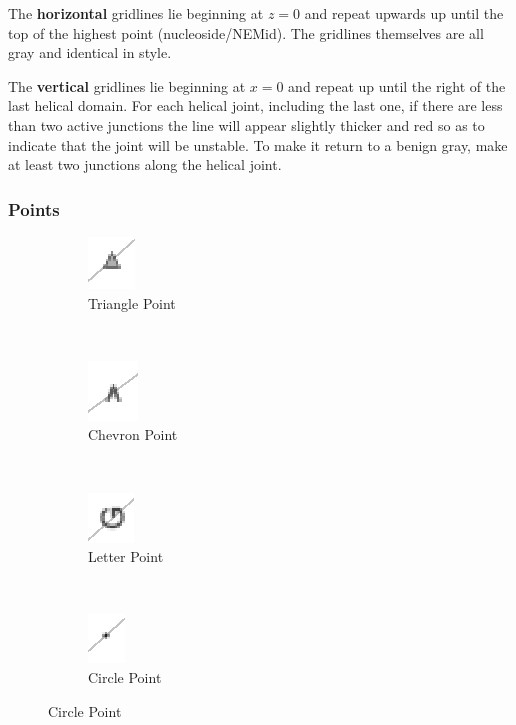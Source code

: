 \documentclass[titlepage]{article}
\begin{document}
The \textbf{horizontal} gridlines lie beginning at $z=0$ and repeat upwards up until the top of the highest point (nucleoside/NEMid). The gridlines themselves are all gray and identical in style.

The \textbf{vertical} gridlines lie beginning at $x=0$ and repeat up until the right of the last helical domain. For each helical joint, including the last one, if there are less than two active junctions the line will appear slightly thicker and red so as to indicate that the joint will be unstable. To make it return to a benign gray, make at least two junctions along the helical joint.

\subsubsection{Points}

\begin{figure}[h] \label{fig:side-view-plot-point-graphics}
	\centering
	\caption{Side View Plot Point Graphics}
	
	\begin{subfigure}{.22\linewidth} \label{fig:up-triangle}
		\centering
		\includegraphics[width=.3in]{up-triangle.png}
		\caption{Triangle Point}
	\end{subfigure}%
	~
	\begin{subfigure}{.22\linewidth} \label{fig:up-chevron}
		\centering
		\includegraphics[width=.3in]{up-chevron.png}
		\caption{Chevron Point}
	\end{subfigure}%
	~
	\begin{subfigure}{.22\linewidth} \label{fig:base-symbol}
		\centering
		\includegraphics[width=.3in]{base-symbol.png}
		\caption{Letter Point}
	\end{subfigure}%
	~
	\begin{subfigure}{.22\linewidth} \label{fig:nondominant-point}
		\centering
		\includegraphics[width=.3in]{nondominant-point.png}
		\caption{Circle Point}
	\end{subfigure}
\end{figure}
\end{document}
